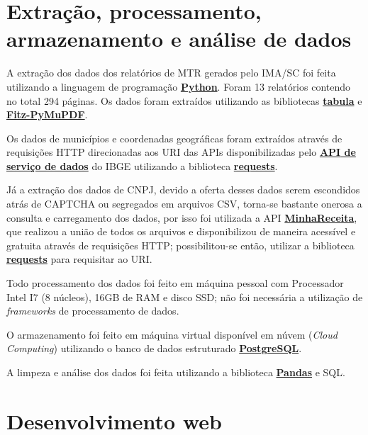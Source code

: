 \section{Extração, processamento, armazenamento e análise de dados}

A extração dos dados dos relatórios de \gls{MTR} gerados pelo \gls{IMA/SC} foi feita utilizando a linguagem de programação \href{https://www.python.org/}{\textbf{Python}}. Foram 13 relatórios contendo no total 294 páginas. Os dados foram extraídos utilizando as bibliotecas \href{https://tabula.technology/}{\textbf{tabula}} e \href{https://pymupdf.readthedocs.io/en/latest/}{\textbf{Fitz-PyMuPDF}}.

Os dados de municípios e coordenadas geográficas foram extraídos através de requisições \gls{HTTP} direcionadas aos \gls{URI} das \gls{API}s disponibilizadas pelo \href{https://servicodados.ibge.gov.br/api/docs/}{\textbf{\gls{API} de serviço de dados}} do \gls{IBGE} utilizando a biblioteca \href{https://pypi.org/project/requests/}{\textbf{requests}}.

Já a extração dos dados de \gls{CNPJ}, devido a oferta desses dados serem escondidos atrás de \gls{CAPTCHA} ou segregados em arquivos \gls{CSV}, torna-se bastante onerosa a consulta e carregamento dos dados, por isso foi utilizada a \gls{API} \href{https://docs.minhareceita.org/}{\textbf{MinhaReceita}}, que realizou a união de todos os arquivos e disponibilizou de maneira acessível e gratuita através de requisições \gls{HTTP}; possibilitou-se então, utilizar a biblioteca \href{https://pypi.org/project/requests/}{\textbf{requests}} para requisitar ao \gls{URI}.

Todo processamento dos dados foi feito em máquina pessoal com Processador Intel I7 (8 núcleos), 16GB de \gls{RAM} e disco \gls{SSD}; não foi necessária a utilização de \textit{frameworks} de processamento de dados.

O armazenamento foi feito em máquina virtual disponível em núvem (\textit{Cloud Computing}) utilizando o banco de dados estruturado \href{https://www.postgresql.org/}{\textbf{PostgreSQL}}.

A limpeza e análise dos dados foi feita utilizando a biblioteca \href{https://pandas.pydata.org/}{\textbf{Pandas}} e \gls{SQL}.

\section{Desenvolvimento web}

